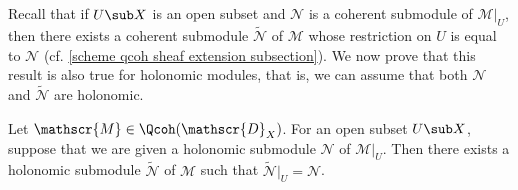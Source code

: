 Recall that if $U\sub X$ is an open subset and $\mathscr{N}$ is a coherent submodule of $\mathscr{M}|_U$, then there exists a coherent submodule $\widetilde{\mathscr{N}}$ of $\mathscr{M}$ whose restriction on $U$ is equal to $\mathscr{N}$ (cf. \autoref{scheme qcoh sheaf extension subsection}). We now prove that this result is also true for holonomic modules, that is, we can assume that both $\mathscr{N}$ and $\widetilde{\mathscr{N}}$ are holonomic.
\begin{proposition}\label{D-module holonomic open subset extension exist}
Let $\mathscr{M}\in\Qcoh(\mathscr{D}_X)$. For an open subset $U\sub X$, suppose that we are given a holonomic submodule $\mathscr{N}$ of $\mathscr{M}|_U$. Then there exists a holonomic submodule $\widetilde{\mathscr{N}}$ of $\mathscr{M}$ such that $\widetilde{\mathscr{N}}|_U=\mathscr{N}$.
\end{proposition}
